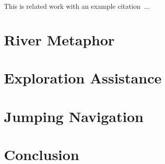 This is related work with an example citation~\cite{Kulik2011}...
%


\section{River Metaphor}
\section{Exploration Assistance}
\section{Jumping Navigation}
\section{Conclusion}
%

%